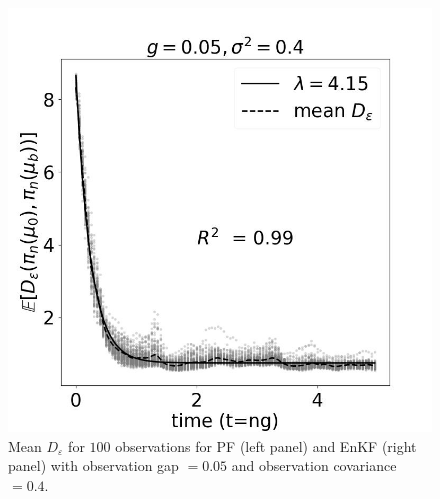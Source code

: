 {\begin{figure}
    \includegraphics[scale=0.3]{stability/plots/plots-enkf-100_enkf.jpg}
    \caption{Mean $D_\varepsilon$ for $100$ observations for PF (left panel) and EnKF (right panel) with observation gap  $=0.05$ and observation covariance $=0.4$.}
    \label{fig:obs-100--probing-nfs}
\end{figure}
}



